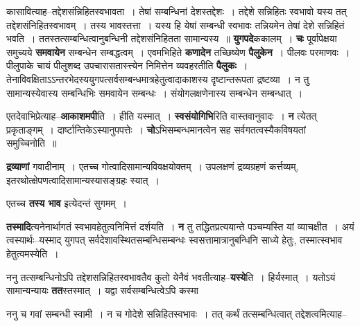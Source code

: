 \documentclass[article,12pt,a4paper]{memoir}
\begin{document}
	कासावित्याह--तद्देशसंन्निहितस्वभावता । तेषां सम्बन्धिनां देशस्तद्देशः । तद्देशे सन्निहितः स्वभावो यस्य तत् तद्देशसंनिहितस्वभावम् । तस्य भावस्तत्ता । यस्य हि येषां सम्बन्धी स्वभावः तन्नियमेन तेषां देशे सन्निहितं भवति । ततस्तत्सम्बन्धित्वानुबन्धिनी तद्देशसंनिहितता सामान्यस्य ॥ \textbf{युगपदे}ककालम् । \textbf{चः} पूर्वापेक्षया समुच्यये \textbf{समवायेन} सम्बन्धेन सम्बद्धत्वम् । एवमभिहिते \textbf{कणादेन} तच्छिष्येण \textbf{पैलुकेन} । पीलवः परमाणवः । पीलुपाके चायं पीलुशब्द उपचारासतास्त्त्येन  निमित्तेन व्यवहरतीति \textbf{पैलुकः} । तेनाविवक्षिताऽऽन्तरभेदस्ययुगपत्सर्वसम्बन्धमात्रहेतुत्वादाकाशस्य दृष्टान्तरूपता द्रष्टव्या । न तु सामान्यस्येवास्य सम्बन्धिभिः समवायेन सम्बन्धः । संयोगलक्षणेनास्य सम्बन्धेन सम्बन्धात् ।
	\pend
      

	  \pstart एतदेवाभिप्रेत्याह--\textbf{आकाशमपी}ति । हीति यस्मात् । \textbf{स्वसंयोगिभि}रिति वास्तवानुवादः । \textbf{न} त्येतत् प्रकृताङ्गम् । दार्ष्टान्तिकेऽस्यानुपपत्तेः । \textbf{चो}ऽभिसम्बन्धमानत्वेन सह सर्वगतत्वस्यैकविषयतां समुच्चिनोति ॥
	\pend
      

	  \pstart \textbf{द्रव्याणां} गवादीनाम् । एतच्च गोत्वादिसामान्यविवक्षयोक्तम् । उपलक्षणं द्रव्यग्रहणं कर्त्तव्यम्, इतरथोत्क्षेपणत्वादिसामान्यस्यासङ्ग्रहः स्यात् ।
	\pend
      

	  \pstart एतच्च \textbf{तस्य भाव} इत्येदन्तं सुगमम् ।
	\pend
      

	  \pstart {}\textbf{तस्मादि}त्यनेनार्थागतं स्वभावहेतुत्वनिमित्तं दर्शयति । \textbf{न} तु तद्धितप्रत्ययान्ते पञ्चम्यस्ति यां व्याचक्षीत । अयं त्वस्यार्थः--यस्माद् युगपत् सर्वदेशावस्थितसम्बन्धिसम्बन्धः स्वसत्तामात्रानुबन्धिनि साध्ये हेतुः, तस्मात्स्वभाव हेतुत्वमस्येति ।
	\pend
      

	  \pstart ननु तत्सम्बन्धिनोऽपि तद्देशसन्निहितस्वभावतैव कुतो येनैवं भवतीत्याह--\textbf{यस्ये}ति । हिर्यस्मात् । यतोऽयं सामान्यन्यायः \textbf{तत}स्त\leavevmode{}स्मात् । यद्वा सर्वसम्बन्धित्वेऽपि कस्मा   \leavevmode{} 
	  
	ननु च गवां सम्बन्धी स्वामी । न च गोदेशे सन्निहितस्वभावः । तत् कर्थं तत्सम्बन्धित्वात् तद्देशत्वमित्याह--  
	  
\end{document}

